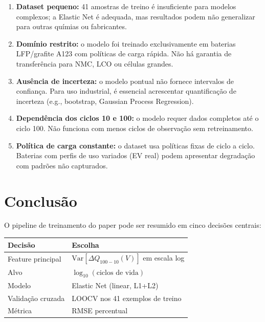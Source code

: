 \documentclass[12pt,a4paper]{article}
\begin{document}
\begin{enumerate}
  \item \textbf{Dataset pequeno:} 41 amostras de treino \'{e} insuficiente para
    modelos complexos; a Elastic Net \'{e} adequada, mas resultados podem n\~ao
    generalizar para outras qu\'{i}mias ou fabricantes.

  \item \textbf{Dom\'{i}nio restrito:} o modelo foi treinado exclusivamente em
    baterias LFP/grafite A123 com pol\'{i}ticas de carga r\'{a}pida. N\~ao h\'{a}
    garantia de transfer\^{e}ncia para NMC, LCO ou c\'{e}lulas grandes.

  \item \textbf{Aus\^{e}ncia de incerteza:} o modelo pontual n\~ao fornece
    intervalos de confian\c{c}a. Para uso industrial, \'{e} essencial acrescentar
    quantifica\c{c}\~ao de incerteza (e.g., bootstrap, Gaussian Process Regression).

  \item \textbf{Depend\^{e}ncia dos ciclos 10 e 100:} o modelo requer dados
    completos at\'{e} o ciclo 100. N\~ao funciona com menos ciclos de observa\c{c}\~ao
    sem retreinamento.

  \item \textbf{Pol\'{i}tica de carga constante:} o dataset usa pol\'{i}ticas fixas
    de ciclo a ciclo. Baterias com perfis de uso variados (EV real) podem
    apresentar degrada\c{c}\~ao com padr\~oes n\~ao capturados.
\end{enumerate}

\section{Conclus\~ao}

O pipeline de treinamento do paper pode ser resumido em cinco decis\~oes centrais:

\begin{center}
\begin{tabular}{@{}ll@{}}
\toprule
\textbf{Decis\~ao} & \textbf{Escolha} \\
\midrule
Feature principal    & $\text{Var}[\Delta Q_{100-10}(V)]$ em escala log \\
Alvo                 & $\log_{10}(\text{ciclos de vida})$ \\
Modelo               & Elastic Net (linear, L1+L2) \\
Valida\c{c}\~ao cruzada & LOOCV nos 41 exemplos de treino \\
M\'{e}trica              & RMSE percentual \\
\bottomrule
\end{tabular}
\end{center}
\end{document}
